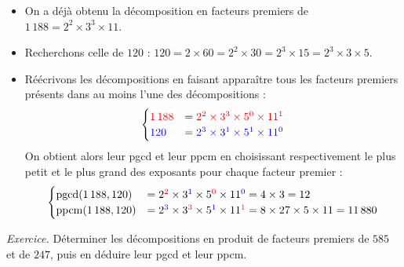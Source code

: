\documentclass[11pt,class=report,crop=false]{standalone}
\newcommand{\pgcd}{\mathop{\mathrm{pgcd}}\nolimits}
\newcommand{\ppcm}{\mathop{\mathrm{ppcm}}\nolimits}
\begin{document}
\begin{itemize}
    \item On a déjà obtenu la décomposition en facteurs premiers de $1\,188=2^2\times3^3\times11$. 
    
    \item Recherchons celle de $120$ :    
    $120 = 2\times 60 = 2^2\times 30 = 2^3\times 15 = 2^3 \times 3 \times 5$.
    
    \item Réécrivons les décompositions en faisant apparaître tous les facteurs premiers présents dans au moins l'une des décompositions :
    $$ \begin{cases} 
    \textcolor{red}{1\,188} & = \textcolor{red}{2^2 \times 3^3 \times 5^0 \times 11^1} \\
    \textcolor{blue}{120} & = \textcolor{blue}{2^3 \times 3^1 \times 5^1 \times 11^0} \end{cases} $$
    On obtient alors leur pgcd et leur ppcm en choisissant respectivement le plus petit et le plus grand des exposants pour chaque facteur premier :
    $$ \begin{cases} 
    \pgcd(1\,188,120) & = 2^{\textcolor{red}{2}} \times 3^{\textcolor{blue}{1}} \times 5^{\textcolor{red}{0}} \times 11^{\textcolor{blue}{0}}  = 4\times3=12 \\
    \ppcm(1\,188,120) & = 2^{\textcolor{blue}{3}} \times 3^{\textcolor{red}{3}} \times 5^{\textcolor{blue}{1}} \times 11^{\textcolor{red}{1}}  = 8\times27\times5\times11=11\,880\\ \end{cases}$$
\end{itemize}

\bigskip

\emph{Exercice.}
Déterminer les décompositions en produit de facteurs premiers de $585$ et de $247$, puis en déduire leur pgcd et leur ppcm.
\end{document}
